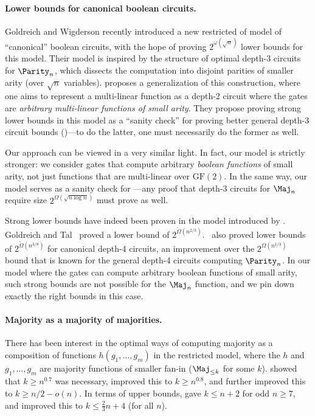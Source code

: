 \paragraph*{Lower bounds for canonical boolean circuits.} Goldreich and Wigderson \cite{GW20} recently introduced a new restricted of model of ``canonical'' boolean circuits, with the hope of proving $2^{\omega(\sqrt{n})}$ lower bounds for this model. Their model is inspired by the structure of optimal depth-3 circuits for $\Parity_n$, which dissects the computation into disjoint parities of smaller arity (over $\sqrt{n}$ variables). \cite{GW20} proposes a generalization of this construction, where one aims to represent a multi-linear function as a depth-2 circuit where the gates are \emph{arbitrary multi-linear functions of small arity}. They propose proving strong lower bounds in this model as a ``sanity check'' for proving better general depth-3 circuit bounds ()---to do the latter, one must necessarily do the former as well.

Our approach can be viewed in a very similar light.
In fact, our model is strictly stronger:
we consider gates that compute arbitrary \emph{boolean functions} of small arity, not just functions that are multi-linear over $\mathrm{GF}(2)$.
In the same way, our model serves as a sanity check for ---any proof that depth-3 circuits for $\Maj_n$ require size $2^{\Omega(\sqrt{n\log n})}$ must prove  as well.

Strong lower bounds have indeed been proven in the model introduced by \cite{GW20}.  Goldreich and Tal~\cite{GT18} proved a lower bound of $2^{\tilde{\Omega}(n^{2/3})}$.~\cite{GT20} also proved lower bounds of $2^{\tilde{\Omega}(n^{3/8})}$ for canonical depth-4 circuits, an improvement over the $2^{\Omega(n^{1/3})}$ bound that is known for the general depth-4 circuits computing $\Parity_n$.  In our model where the gates can compute arbitrary boolean functions of small arity, such strong bounds are not possible for the $\Maj_n$ function, and we pin down exactly the right bounds in this case. 





\paragraph*{Majority as a majority of majorities.} There has been interest \cite{KP19,EGMR20,HNRRY19,KM18,Pos17} in the optimal ways of computing majority as a composition of functions $h(g_1, \ldots, g_m)$ in the restricted model, where the $h$ and $g_1, \ldots, g_m$ are majority functions of smaller fan-in ($\Maj_{\leq k}$ for some $k$). \cite{KP19} showed that $k\geq n^{0.7}$ was necessary, \cite{EGMR20} improved this to $k \geq n^{0.8}$, and \cite{HNRRY19} further improved this to $k \geq n/2 - o(n)$. In terms of upper bounds, \cite{KM18} gave $k \leq n+2$ for odd $n \geq 7$, and \cite{Pos17} improved this to $k \leq \frac{2}{3}n+4$ (for all $n$).


